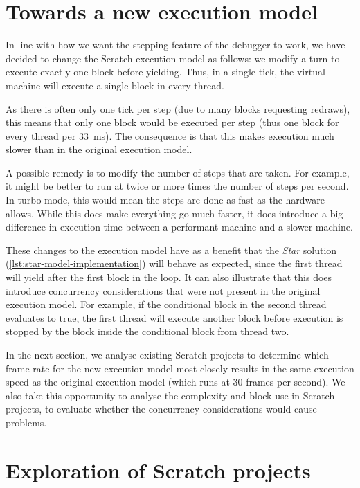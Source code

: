 \documentclass[../main]{subfiles}
\begin{document}
\section{Towards a new execution model}\label{sec:a-family-of-new-execution-models}

In line with how we want the stepping feature of the debugger to work, we have decided to change the Scratch execution model as follows: we modify a turn to execute exactly one block before yielding.
Thus, in a single tick, the virtual machine will execute a single block in every thread.

As there is often only one tick per step (due to many blocks requesting redraws), this means that only one block would be executed per step (thus one block for every thread per \qty{33}{\milli\second}).
The consequence is that this makes execution much slower than in the original execution model.

A possible remedy is to modify the number of steps that are taken.
For example, it might be better to run at twice or more times the number of steps per second.
In turbo mode, this would mean the steps are done as fast as the hardware allows.
While this does make everything go much faster, it does introduce a big difference in execution time between a performant machine and a slower machine.

These changes to the execution model have as a benefit that the \emph{Star} solution (\cref{lst:star-model-implementation}) will behave as expected, since the first thread will yield after the first block in the loop.
It can also illustrate that this does introduce concurrency considerations that were not present in the original execution model.
For example, if the conditional block in the second thread evaluates to true, the first thread will execute another block before execution is stopped by the block inside the conditional block from thread two.

In the next section, we analyse existing Scratch projects to determine which frame rate for the new execution model most closely results in the same execution speed as the original execution model (which runs at 30 frames per second).
We also take this opportunity to analyse the complexity and block use in Scratch projects, to evaluate whether the concurrency considerations would cause problems.

\section{Exploration of Scratch projects}\label{sec:evaluation-of-scratch-projects}
\end{document}

